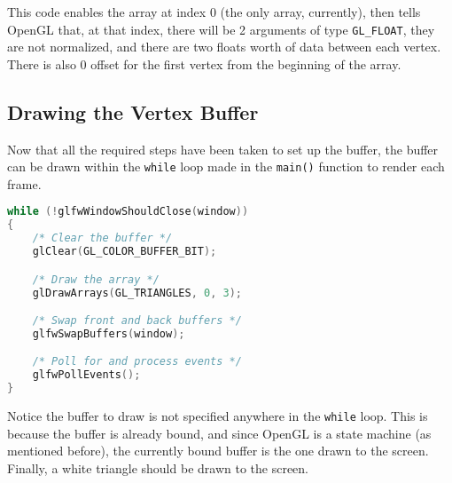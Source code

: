 \documentclass{article}
\newcommand{\ilcode}[1]{{\footnotesize\texttt{#1}}}
\begin{document}
This code enables the array at index 0 (the only array, currently), then tells OpenGL that, at that index, there will be 2 arguments of type \ilcode{GL\_FLOAT}, they are not normalized, and there are two floats worth of data between each vertex. There is also 0 offset for the first vertex from the beginning of the array.

\subsection{Drawing the Vertex Buffer}

Now that all the required steps have been taken to set up the buffer, the buffer can be drawn within the \ilcode{while} loop made in the \ilcode{main()} function to render each frame.

\begin{lstlisting}[language=C++]
while (!glfwWindowShouldClose(window))
{
    /* Clear the buffer */
    glClear(GL_COLOR_BUFFER_BIT);

    /* Draw the array */
    glDrawArrays(GL_TRIANGLES, 0, 3);

    /* Swap front and back buffers */
    glfwSwapBuffers(window);

    /* Poll for and process events */
    glfwPollEvents();
}
\end{lstlisting}

Notice the buffer to draw is not specified anywhere in the \ilcode{while} loop. This is because the buffer is already bound, and since OpenGL is a state machine (as mentioned before), the currently bound buffer is the one drawn to the screen.
Finally, a white triangle should be drawn to the screen.
\end{document}
